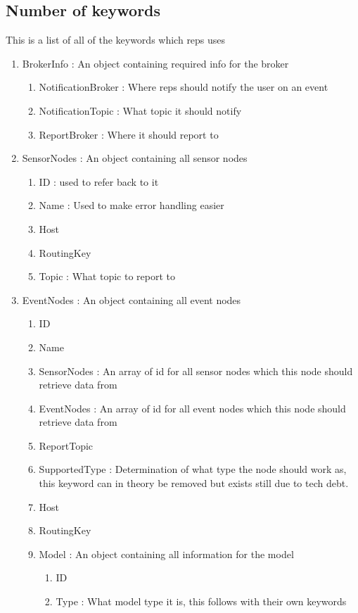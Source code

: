 \documentclass[a4paper,8pt]{article}
\begin{document}
	\subsection{Number of keywords}\label{sec:Keywords}
	This is a list of all of the keywords which \gls{reps} uses
	\begin{enumerate}
		\item BrokerInfo : An object containing required info for the broker
		\begin{enumerate}
			\item NotificationBroker : Where \gls{reps} should notify the user on an event
			\item NotificationTopic : What topic it should notify
			\item ReportBroker : Where it should report to
		\end{enumerate}
		\item SensorNodes : An object containing all sensor nodes
		\begin{enumerate}
			\item ID : used to refer back to it
			\item Name : Used to make error handling easier
			\item Host
			\item RoutingKey
			\item Topic : What topic to report to
		\end{enumerate}
		\item EventNodes : An object containing all event nodes
		\begin{enumerate}
			\item ID
			\item Name
			\item SensorNodes : An array of id for all sensor nodes which this node should retrieve data from
			\item EventNodes : An array of id for all event nodes which this node should retrieve data from
			\item ReportTopic
			\item SupportedType : Determination of what type the node should work as, this keyword can in theory be removed but exists still due to tech debt.
			\item Host
			\item RoutingKey
			\item Model : An object containing all information for the model
			\begin{enumerate}
				\item ID
				\item Type : What model type it is, this follows with their own keywords

\end{enumerate}
\end{enumerate}
\end{enumerate}
\end{document}
